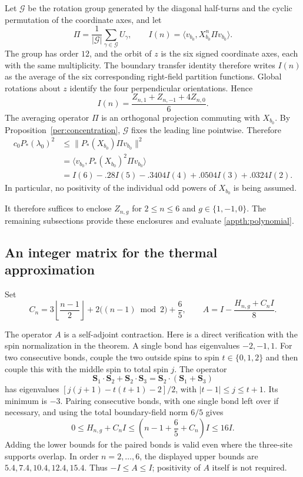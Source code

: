 \documentclass[11pt]{article}
\theoremstyle{remark}
\numberwithin{equation}{section}
\begin{document}
Let $\mathcal G$ be the rotation group generated by the diagonal half-turns and the
cyclic permutation of the coordinate axes, and let
\[
 \Pi=\frac1{|\mathcal G|}\sum_{\gamma\in\mathcal G}U_\gamma,
 \qquad I(n)=\langle v_{b_0},X_{b_0}^n\Pi v_{b_0}\rangle.
\]
The group has order $12$, and the orbit of $z$ is the six signed coordinate
axes, each with the same multiplicity. The boundary transfer identity
therefore writes $I(n)$ as the average of the six corresponding right-field
partition functions. Global rotations about $z$ identify the four
perpendicular orientations. Hence
\begin{equation}\label{appth:average}
 I(n)=\frac{Z_{n,1}+Z_{n,-1}+4Z_{n,0}}6.
\end{equation}
The averaging operator $\Pi$ is an orthogonal projection commuting with
$X_{b_0}$. By Proposition~\ref{per:concentration}, $\mathcal G$ fixes the
leading line pointwise. Therefore
\begin{align}
 c_0P_*(\lambda_0)^2
 &\le\|P_*(X_{b_0})\Pi v_{b_0}\|^2\nonumber\\
 &=\langle v_{b_0},P_*(X_{b_0})^2\Pi v_{b_0}\rangle\nonumber\\
 &=I(6)-.28I(5)-.3404I(4)+.0504I(3)+.0324I(2).
 \label{appth:polynomial}
\end{align}
In particular, no positivity of the individual odd powers of $X_{b_0}$
is being assumed.

It therefore suffices to enclose $Z_{n,g}$ for $2\le n\le6$ and
$g\in\{1,-1,0\}$. The remaining subsections provide these enclosures
and evaluate \eqref{appth:polynomial}.

\subsection{An integer matrix for the thermal approximation}

Set
\begin{equation}\label{appth:C}
 C_n=3\left\lfloor\frac{n-1}{2}\right\rfloor
          +2\bigl((n-1)\bmod2\bigr)+\frac65,
 \qquad A=I-\frac{H_{n,g}+C_n I}{8}.
\end{equation}

The operator $A$ is a self-adjoint contraction. Here is a direct verification
with the spin normalization in the theorem. A single bond has eigenvalues
$-2,-1,1$. For two consecutive bonds, couple the two outside spins to spin
$t\in\{0,1,2\}$ and then couple this with the middle spin to total spin $j$.
The operator
\[
 \mathbf S_1\mathbin\cdot\mathbf S_2+
 \mathbf S_2\mathbin\cdot\mathbf S_3
   =\mathbf S_2\mathbin\cdot(\mathbf S_1+\mathbf S_3)
\]
has eigenvalues $[j(j+1)-t(t+1)-2]/2$, with
$|t-1|\le j\le t+1$. Its minimum is $-3$.
Pairing consecutive bonds, with one single bond left over if necessary,
and using the total boundary-field norm $6/5$ gives
\[
 0\le H_{n,g}+C_n I
    \le\left(n-1+\frac65+C_n\right)I\le16I.
\]
Adding the lower bounds for the paired bonds is valid even where the
three-site supports overlap. In order $n=2,\ldots,6$, the displayed upper
bounds are $5.4,7.4,10.4,12.4,15.4$. Thus $-I\le A\le I$;
positivity of $A$ itself is not required.
\end{document}
